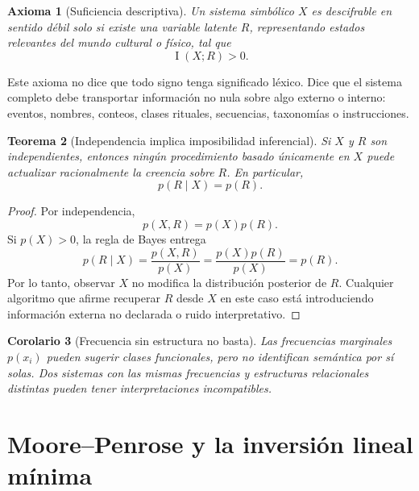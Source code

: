 \documentclass[11pt,a4paper]{article}
\newtheorem{theorem}{Teorema}[section]
\newtheorem{corollary}[theorem]{Corolario}
\newtheorem{axiom}[theorem]{Axioma}
\DeclareMathOperator{\MI}{I}
\newcommand{\1}{\mathbf{1}}
\numberwithin{equation}{section}
\begin{document}
\begin{axiom}[Suficiencia descriptiva]
Un sistema simbólico \(X\) es descifrable en sentido débil solo si existe una variable latente \(R\), representando estados relevantes del mundo cultural o físico, tal que
\begin{equation}
    \MI(X;R)>0.
\end{equation}
\end{axiom}

Este axioma no dice que todo signo tenga significado léxico. Dice que el sistema completo debe transportar información no nula sobre algo externo o interno: eventos, nombres, conteos, clases rituales, secuencias, taxonomías o instrucciones.

\begin{theorem}[Independencia implica imposibilidad inferencial]
Si \(X\) y \(R\) son independientes, entonces ningún procedimiento basado únicamente en \(X\) puede actualizar racionalmente la creencia sobre \(R\). En particular,
\begin{equation}
    p(R\mid X)=p(R).
\end{equation}
\end{theorem}

\begin{proof}
Por independencia,
\[
    p(X,R)=p(X)p(R).
\]
Si \(p(X)>0\), la regla de Bayes entrega
\[
    p(R\mid X)=\frac{p(X,R)}{p(X)}
    =
    \frac{p(X)p(R)}{p(X)}
    =
    p(R).
\]
Por lo tanto, observar \(X\) no modifica la distribución posterior de \(R\). Cualquier algoritmo que afirme recuperar \(R\) desde \(X\) en este caso está introduciendo información externa no declarada o ruido interpretativo.
\end{proof}

\begin{corollary}[Frecuencia sin estructura no basta]
Las frecuencias marginales \(p(x_i)\) pueden sugerir clases funcionales, pero no identifican semántica por sí solas. Dos sistemas con las mismas frecuencias y estructuras relacionales distintas pueden tener interpretaciones incompatibles.
\end{corollary}

\section{Moore--Penrose y la inversión lineal mínima}
\end{document}
